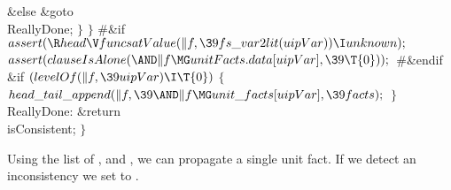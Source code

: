 {{{{{\&{else}\1\5
\&{goto} \\{ReallyDone};\2\6
\4${}\}{}$\2\6
\4${}\}{}$\2\6
\8\#\&{if} \6
${}\\{assert}(\R\\{head}\V\\{funcsatValue}(\|f,\39\\{fs\_var2lit}(\\{uipVar}))%
\I\\{unknown});{}$\6
${}\\{assert}(\\{clauseIsAlone}({\AND}\|f\MG\\{unitFacts}.\\{data}[\\{uipVar}],%
\39\T{0}));{}$\6
\8\#\&{endif}\6
\&{if} ${}(\\{levelOf}(\|f,\39\\{uipVar})\I\T{0}){}$\5
${}\{{}$\1\6
${}\\{head\_tail\_append}(\|f,\39{\AND}\|f\MG\\{unit\_facts}[\\{uipVar}],\39%
\\{facts});{}$\6
\4${}\}{}$\2\6
\4\\{ReallyDone}:\5
\&{return} \\{isConsistent};\6
\4${}\}{}$\2\par
\fi

Using the list of ,  and , we
can propagate a single unit
fact. If we detect an inconsistency we set  to .

}}}}}
